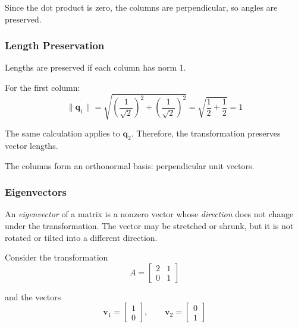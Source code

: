 Since the dot product is zero, the columns are perpendicular, so angles are preserved.

\subsubsection*{Length Preservation}

Lengths are preserved if each column has norm 1.

For the first column:
\[
\|\mathbf{q}_1\|
=
\sqrt{
\left(\frac{1}{\sqrt{2}}\right)^2
+
\left(\frac{1}{\sqrt{2}}\right)^2
}
=
\sqrt{\frac{1}{2} + \frac{1}{2}}
=
1
\]

The same calculation applies to $\mathbf{q}_2$.  
Therefore, the transformation preserves vector lengths.

\medskip

\begin{center}
\end{center}

The columns form an orthonormal basis: perpendicular unit vectors.

\subsubsection{Eigenvectors}

An \textit{eigenvector} of a matrix is a nonzero vector whose \emph{direction} does not change under the transformation. The vector may be stretched or shrunk, but it is not rotated or tilted into a different direction.

\medskip

Consider the transformation
\[
A =
\begin{bmatrix}
2 & 1 \\
0 & 1
\end{bmatrix}
\]

and the vectors
\[
\mathbf{v}_1 =
\begin{bmatrix}
1 \\ 0
\end{bmatrix},
\qquad
\mathbf{v}_2 =
\begin{bmatrix}
0 \\ 1
\end{bmatrix}
\]

